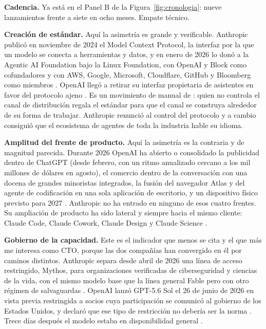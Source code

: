 \documentclass[11pt,letterpaper]{article}
\begin{document}
\textbf{Cadencia.} Ya está en el Panel B de la Figura~\ref{fig:cronologia}: nueve
lanzamientos frente a siete en ocho meses. Empate técnico.

\textbf{Creación de estándar.} Aquí la asimetría es grande y verificable.
Anthropic publicó en noviembre de 2024 el Model Context Protocol, la interfaz por
la que un modelo se conecta a herramientas y datos, y en enero de 2026 lo donó a
la Agentic AI Foundation bajo la Linux Foundation, con OpenAI y Block como
cofundadores y con AWS, Google, Microsoft, Cloudflare, GitHub y Bloomberg como
miembros \parencite{anthropic2026mcp}. OpenAI llegó a retirar su interfaz
propietaria de asistentes en favor del protocolo ajeno
\parencite{workos2026mcp}. Es un movimiento de manual de \textcite{shapiro1999}:
quien no controla el canal de distribución regala el estándar para que el canal
se construya alrededor de su forma de trabajar. Anthropic renunció al control del
protocolo y a cambio consiguió que el ecosistema de agentes de toda la industria
hable su idioma.

\textbf{Amplitud del frente de producto.} Aquí la asimetría es la contraria y de
magnitud parecida. Durante 2026 OpenAI ha abierto o consolidado la publicidad
dentro de ChatGPT (desde febrero, con un ritmo anualizado cercano a los mil
millones de dólares en agosto), el comercio dentro de la conversación con una
docena de grandes minoristas integrados, la fusión del navegador Atlas y del
agente de codificación en una sola aplicación de escritorio, y un dispositivo
físico previsto para 2027 \parencite{tnw2026friar,digitalapplied2026work}.
Anthropic no ha entrado en ninguno de esos cuatro frentes. Su ampliación de
producto ha sido lateral y siempre hacia el mismo cliente: Claude Code, Claude
Cowork, Claude Design y Claude Science \parencite{wikipedia2026claude}.

\textbf{Gobierno de la capacidad.} Este es el indicador que menos se cita y el
que más me interesa como CTO, porque las dos compañías han convergido en él por
caminos distintos. Anthropic separa desde abril de 2026 una línea de acceso
restringido, Mythos, para organizaciones verificadas de ciberseguridad y ciencias
de la vida, con el mismo modelo base que la línea general Fable pero con otro
régimen de salvaguardas \parencite{anthropic2026fable51,anthropic2026precios}.
OpenAI lanzó GPT-5.6 Sol el 26 de junio de 2026 en vista previa restringida a
socios cuya participación se comunicó al gobierno de los Estados Unidos, y
declaró que ese tipo de restricción no debería ser la norma
\parencite{techcrunch2026restriccion}. Trece días después el modelo estaba en
disponibilidad general \parencite{openai2026gpt56}.
\end{document}
